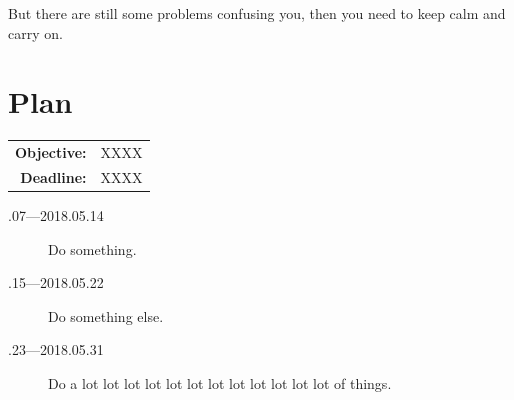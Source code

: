 \documentclass[a4paper]{article}
\begin{document}
But there are still some problems confusing you, then you need to keep calm and carry on.

\section{Plan}

\begin{tabular}{rl}
	\textbf{Objective:} & XXXX \\
    \textbf{Deadline:} & XXXX 
\end{tabular}

\begin{description}
    \item[.07---2018.05.14] Do something.
    \item[.15---2018.05.22] Do something else.
    \item[.23---2018.05.31] Do a lot lot lot lot lot lot lot lot lot lot lot lot of things.
\end{description}



\end{document}
